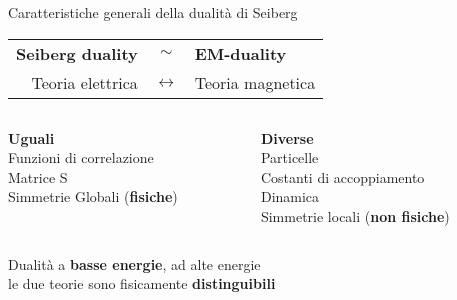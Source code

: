 \documentclass[10pt,compress,usenames,dvipsnames]{beamer}
\begin{document}
\begin{frame}{Caratteristiche generali della dualità di Seiberg}
\begin{center}
\begin{tabular}{r c l }
 {\bfseries \Large Seiberg duality} & $\sim$ &{\bfseries \Large EM-duality}\\[0,3cm]
{ \large Teoria elettrica } & $\longleftrightarrow$ & {\large Teoria magnetica}
\end{tabular}
%
\end{center}
\begin{columns}[c]
	\begin{column}{0.5 \textwidth}			
		\begin{center}
		{\bfseries Uguali} \\
		Funzioni di correlazione \\
		Matrice S \\
		Simmetrie Globali (\alert{\bfseries fisiche})
		\vspace{0,3cm}
		\end{center}
	\end{column}

	\begin{column}{0.5 \textwidth}
		\begin{center}
		{\bfseries Diverse}\\
		Particelle \\
		Costanti di accoppiamento \\
		Dinamica \\
		Simmetrie locali (\alert{\bfseries non fisiche}) \\ 
		\end{center}
	\end{column}
\end{columns}
\begin{center}
{\large  Dualità a \alert{\bfseries basse energie}, ad alte energie \\ le due teorie sono fisicamente \alert{\bfseries distinguibili} }
\end{center}
\end{frame}
\end{document}
